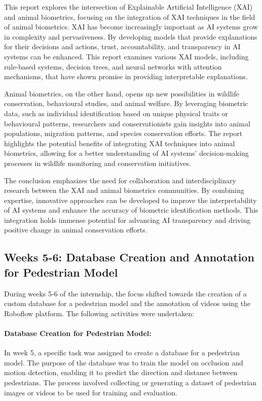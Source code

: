 \documentclass{article}
\begin{document}
This report explores the intersection of Explainable Artificial Intelligence (XAI) and animal biometrics, focusing on the integration of XAI techniques in the field of animal biometrics. XAI has become increasingly important as AI systems grow in complexity and pervasiveness. By developing models that provide explanations for their decisions and actions, trust, accountability, and transparency in AI systems can be enhanced. This report examines various XAI models, including rule-based systems, decision trees, and neural networks with attention mechanisms, that have shown promise in providing interpretable explanations.

Animal biometrics, on the other hand, opens up new possibilities in wildlife conservation, behavioural studies, and animal welfare. By leveraging biometric data, such as individual identification based on unique physical traits or behavioural patterns, researchers and conservationists gain insights into animal populations, migration patterns, and species conservation efforts. The report highlights the potential benefits of integrating XAI techniques into animal biometrics, allowing for a better understanding of AI systems' decision-making processes in wildlife monitoring and conservation initiatives.

The conclusion emphasizes the need for collaboration and interdisciplinary research between the XAI and animal biometrics communities. By combining expertise, innovative approaches can be developed to improve the interpretability of AI systems and enhance the accuracy of biometric identification methods. This integration holds immense potential for advancing AI transparency and driving positive change in animal conservation efforts.
\subsection{Weeks 5-6: Database Creation and Annotation for Pedestrian Model}
During weeks 5-6 of the internship, the focus shifted towards the creation of a custom database for a pedestrian model and the annotation of videos using the Roboflow platform. The following activities were undertaken:

\paragraph{Database Creation for Pedestrian Model:}
In week 5, a specific task was assigned to create a database for a pedestrian model.
The purpose of the database was to train the model on occlusion and motion detection, enabling it to predict the direction and distance between pedestrians.
The process involved collecting or generating a dataset of pedestrian images or videos to be used for training and evaluation.
\end{document}
